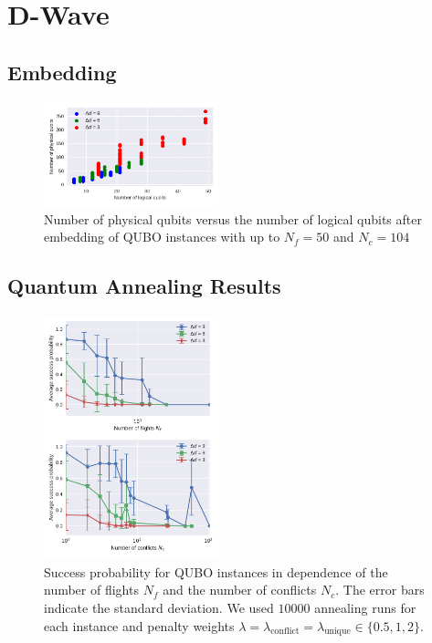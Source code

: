 \section{D-Wave}

\subsection{Embedding}

\begin{figure}[htpb]
    \centering
    \includegraphics[width=0.45\textwidth]{./pics/physicalVsLogicalNumberOfQubits.pdf}
    \caption{Number of physical qubits versus the number of logical qubits after embedding of QUBO instances with up to $N_f=50$ and $N_c=104$}
\label{fig:number_of_physical_qubits}
\end{figure}

\subsection{Quantum Annealing Results}

\begin{figure}[htpb]
    \centering
    \includegraphics[width=0.45\textwidth]{./pics/annealing_results_success_vs_flights_and_conflicts.pdf}
    \caption{Success probability for QUBO instances in dependence of the number of flights $N_f$ and the number of conflicts $N_c$. 
             The error bars indicate the standard deviation.
             We used $10000$ annealing runs for each instance and penalty weights $\lambda = \lambda_\text{conflict} = \lambda_\text{unique} \in \{0.5, 1, 2\}$. 
    }
\label{fig:success_probability}
\end{figure}
